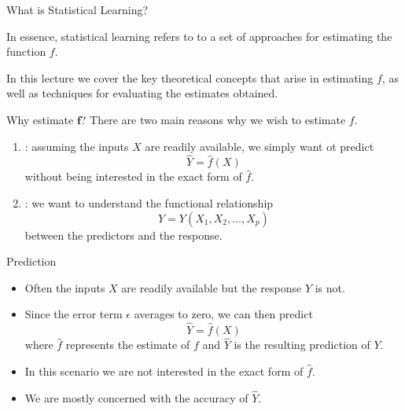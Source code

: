\documentclass[mathserif, aspectratio=169]{beamer}
\begin{document}
\begin{frame}{What is Statistical Learning?}
	\begin{blurb}
		In essence, statistical learning refers to to a set of approaches for estimating
		the function $f$.

		In this lecture we cover the key theoretical concepts that arise in estimating $f$, as well
		as techniques for evaluating the estimates obtained.
	\end{blurb}
\end{frame}
\begin{frame}{Why estimate $\bm{f}$?}
		There are two main reasons why we wish to estimate $f$.
	\begin{enumerate}
		\item {}: assuming the inputs $X$ are readily available, we simply want ot
			predict
			\[\hat{Y} = \hat{f}(X)\]
			without being interested in the exact form of $\hat{f}$.
		\item {}: we want to understand the functional relationship
			\[Y = Y(X_1, X_2, \dots, X_p)\]
			between the predictors and the response.
	\end{enumerate}
\end{frame}

\begin{frame}{Prediction}
	\begin{itemize}
		\item Often the inputs $X$ are readily available but the response $Y$ is not.
		\item Since the error term $\epsilon$ averages to zero, we can then predict
			\[\hat{Y} = \hat{f}(X)\]
			where $\hat{f}$ represents the estimate of $f$ and $\hat{Y}$ is the resulting
			prediction of $Y$.
		\item In this scenario we are not interested in the exact form of $\hat{f}$.
		\item We are mostly concerned with the accuracy of $\hat{Y}$.
	\end{itemize}
\end{frame}
\end{document}
